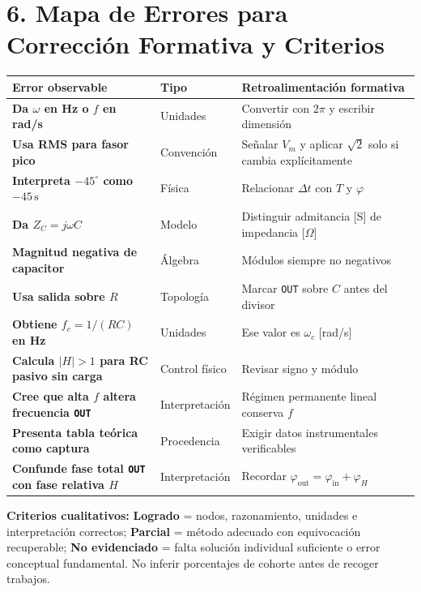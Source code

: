 \documentclass[11pt, a4paper]{article}
\begin{document}
\section*{6. Mapa de Errores para Corrección Formativa y Criterios}
{\small
\renewcommand{\arraystretch}{1.22}
\noindent
\begin{tabularx}{\textwidth}{
  >{\bfseries\RaggedRight}p{4.8cm}
  >{\centering\arraybackslash}p{2.3cm}
  >{\RaggedRight\arraybackslash}X}
\toprule
\textbf{Error observable} & \textbf{Tipo} & \textbf{Retroalimentación formativa} \\
\midrule
Da $\omega$ en Hz o $f$ en rad/s & Unidades & Convertir con $2\pi$ y escribir dimensión \\
Usa RMS para fasor pico & Convención & Señalar $V_m$ y aplicar $\sqrt{2}$ solo si cambia explícitamente \\
Interpreta $-45^\circ$ como $-45\,\text{s}$ & Física & Relacionar $\Delta t$ con $T$ y $\varphi$ \\
Da $Z_C = j\omega C$ & Modelo & Distinguir admitancia [S] de impedancia [$\Omega$] \\
Magnitud negativa de capacitor & Álgebra & Módulos siempre no negativos \\
Usa salida sobre $R$ & Topología & Marcar \texttt{OUT} sobre $C$ antes del divisor \\
Obtiene $f_c = 1/(RC)$ en Hz & Unidades & Ese valor es $\omega_c$ [rad/s] \\
Calcula $|H| > 1$ para RC pasivo sin carga & Control físico & Revisar signo y módulo \\
Cree que alta $f$ altera frecuencia \texttt{OUT} & Interpretación & Régimen permanente lineal conserva $f$ \\
Presenta tabla teórica como captura & Procedencia & Exigir datos instrumentales verificables \\
Confunde fase total \texttt{OUT} con fase relativa $H$ & Interpretación & Recordar $\varphi_{\text{out}} = \varphi_{\text{in}} + \varphi_H$ \\
\bottomrule
\end{tabularx}\par}

\vspace{0.18cm}
\noindent\textbf{Criterios cualitativos:} \textbf{Logrado} = nodos, razonamiento, unidades e interpretación correctos; \textbf{Parcial} = método adecuado con equivocación recuperable; \textbf{No evidenciado} = falta solución individual suficiente o error conceptual fundamental. No inferir porcentajes de cohorte antes de recoger trabajos.
\end{document}
